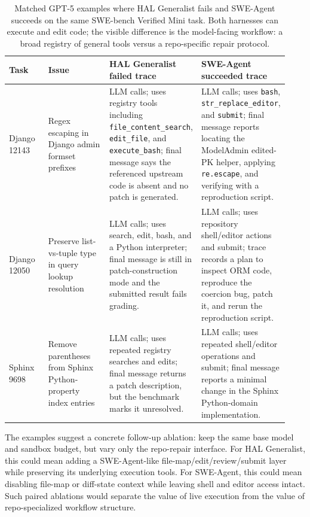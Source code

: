 \begin{table}[h]
\centering
\footnotesize
\setlength{\tabcolsep}{2pt}
\begin{tabular}{>{\raggedright\arraybackslash}p{0.15\linewidth}>{\raggedright\arraybackslash}p{0.24\linewidth}>{\raggedright\arraybackslash}p{0.29\linewidth}>{\raggedright\arraybackslash}p{0.25\linewidth}}
\toprule
Task & Issue & HAL Generalist failed trace & SWE-Agent succeeded trace \\
\midrule
Django 12143 &
Regex escaping in Django admin formset prefixes &
8 LLM calls; uses registry tools including \texttt{file\_content\_search},
\texttt{edit\_file}, and \texttt{execute\_bash}; final message says the
referenced upstream code is absent and no patch is generated. &
25 LLM calls; uses \texttt{bash}, \texttt{str\_replace\_editor}, and
\texttt{submit}; final message reports locating the ModelAdmin edited-PK
helper, applying \texttt{re.escape}, and verifying with a reproduction script. \\
Django 12050 &
Preserve list-vs-tuple type in query lookup resolution &
19 LLM calls; uses search, edit, bash, and a Python interpreter; final message
is still in patch-construction mode and the submitted result fails grading. &
16 LLM calls; uses repository shell/editor actions and submit; trace records a
plan to inspect ORM code, reproduce the coercion bug, patch it, and rerun the
reproduction script. \\
Sphinx 9698 &
Remove parentheses from Sphinx Python-property index entries &
19 LLM calls; uses repeated registry searches and edits; final message returns
a patch description, but the benchmark marks it unresolved. &
42 LLM calls; uses repeated shell/editor operations and submit; final message
reports a minimal change in the Sphinx Python-domain implementation. \\
\bottomrule
\end{tabular}
\caption{Matched GPT-5 examples where HAL Generalist fails and SWE-Agent
succeeds on the same SWE-bench Verified Mini task. Both harnesses can execute
and edit code; the visible difference is the model-facing workflow: a broad
registry of general tools versus a repo-specific repair protocol.}
\label{tab:swebench-trace-examples}
\end{table}

The examples suggest a concrete follow-up ablation: keep the same base model
and sandbox budget, but vary only the repo-repair interface. For HAL
Generalist, this could mean adding a SWE-Agent-like file-map/edit/review/submit
layer while preserving its underlying execution tools. For SWE-Agent, this
could mean disabling file-map or diff-state context while leaving shell and
editor access intact. Such paired ablations would separate the value of live
execution from the value of repo-specialized workflow structure.
